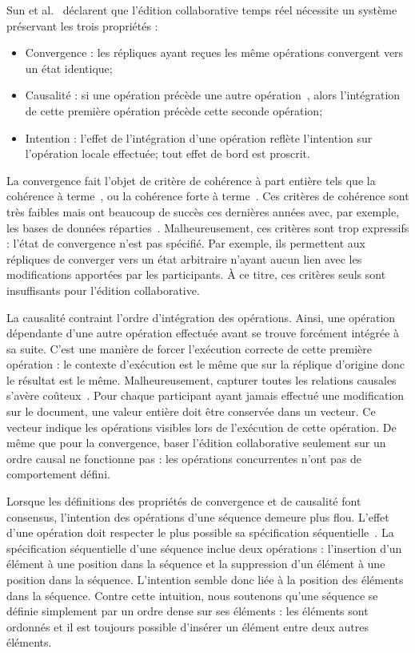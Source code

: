 Sun et al.~\cite{sun1998achieving} déclarent que l'édition collaborative temps
réel nécessite un système préservant les trois propriétés :
\begin{itemize}
\item Convergence : les répliques ayant reçues les même opérations convergent
  vers un état identique;
\item Causalité : si une opération précède une autre
  opération~\cite{lamport1978time}, alors l'intégration de cette première
  opération précède cette seconde opération;
\item Intention : l'effet de l'intégration d'une opération reflète l'intention
  sur l'opération locale effectuée; tout effet de bord est proscrit.
\end{itemize}

\noindent La convergence fait l'objet de critère de cohérence à part entière
tels que la cohérence à terme~\cite{bailis2013eventual}, ou la cohérence forte à
terme~\cite{shapiro2011conflict}. Ces critères de cohérence sont très faibles
mais ont beaucoup de succès ces dernières années avec, par exemple, les bases de
données réparties~\cite{dynamo, riak, cassandra, mongodb}. Malheureusement, ces
critères sont trop expressifs : l'état de convergence n'est pas spécifié. Par
exemple, ils permettent aux répliques de converger vers un état arbitraire
n'ayant aucun lien avec les modifications apportées par les participants. À ce
titre, ces critères seuls sont insuffisants pour l'édition collaborative.

\noindent La causalité contraint l'ordre d'intégration des opérations. Ainsi,
une opération dépendante d'une autre opération effectuée avant se trouve
forcément intégrée à sa suite. C'est une manière de forcer l'exécution correcte
de cette première opération : le contexte d'exécution est le même que sur la
réplique d'origine donc le résultat est le même.  Malheureusement, capturer
toutes les relations causales s'avère
coûteux~\cite{charronbost1991concerning}. Pour chaque participant ayant jamais
effectué une modification sur le document, une valeur entière doit être
conservée dans un vecteur. Ce vecteur indique les opérations visibles lors de
l'exécution de cette opération. De même que pour la convergence, baser l'édition
collaborative seulement sur un ordre causal ne fonctionne pas : les opérations
concurrentes n'ont pas de comportement défini.

\noindent Lorsque les définitions des propriétés de convergence et de causalité
font consensus, l'intention des opérations d'une séquence demeure plus
flou. L'effet d'une opération doit respecter le plus possible sa spécification
séquentielle~\cite{bieniusa2012brief}. La spécification séquentielle d'une
séquence inclue deux opérations : l'insertion d'un élément à une position dans
la séquence et la suppression d'un élément à une position dans la
séquence. L'intention semble donc liée à la position des éléments dans la
séquence. Contre cette intuition, nous soutenons qu'une séquence se définie
simplement par un ordre dense sur ses éléments : les éléments sont ordonnés et
il est toujours possible d'insérer un élément entre deux autres éléments.

